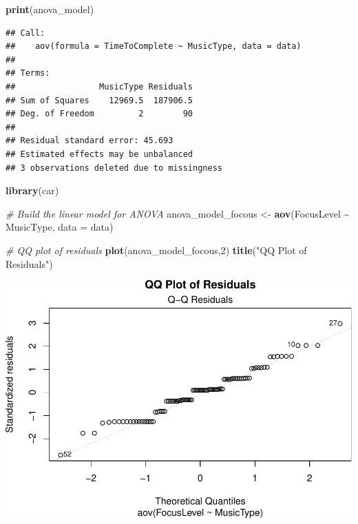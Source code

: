 \documentclass[
]{article}
\newenvironment{Shaded}{\begin{snugshade}}{\end{snugshade}}
\newcommand{\AttributeTok}[1]{\textcolor[rgb]{0.13,0.29,0.53}{#1}}
\newcommand{\CommentTok}[1]{\textcolor[rgb]{0.56,0.35,0.01}{\textit{#1}}}
\newcommand{\DecValTok}[1]{\textcolor[rgb]{0.00,0.00,0.81}{#1}}
\newcommand{\FunctionTok}[1]{\textcolor[rgb]{0.13,0.29,0.53}{\textbf{#1}}}
\newcommand{\NormalTok}[1]{#1}
\newcommand{\OtherTok}[1]{\textcolor[rgb]{0.56,0.35,0.01}{#1}}
\newcommand{\SpecialCharTok}[1]{\textcolor[rgb]{0.81,0.36,0.00}{\textbf{#1}}}
\newcommand{\StringTok}[1]{\textcolor[rgb]{0.31,0.60,0.02}{#1}}
\begin{document}
\begin{Shaded}
\begin{Highlighting}[]
\FunctionTok{print}\NormalTok{(anova\_model)}
\end{Highlighting}
\end{Shaded}

\begin{verbatim}
## Call:
##    aov(formula = TimeToComplete ~ MusicType, data = data)
## 
## Terms:
##                 MusicType Residuals
## Sum of Squares    12969.5  187906.5
## Deg. of Freedom         2        90
## 
## Residual standard error: 45.693
## Estimated effects may be unbalanced
## 3 observations deleted due to missingness
\end{verbatim}

\begin{Shaded}
\begin{Highlighting}[]
\FunctionTok{library}\NormalTok{(car)    }

\CommentTok{\# Build the linear model for ANOVA}
\NormalTok{anova\_model\_focous }\OtherTok{\textless{}{-}} \FunctionTok{aov}\NormalTok{(FocusLevel }\SpecialCharTok{\textasciitilde{}}\NormalTok{ MusicType, }\AttributeTok{data =}\NormalTok{ data)}

\CommentTok{\# QQ plot of residuals}
\FunctionTok{plot}\NormalTok{(anova\_model\_focous,}\DecValTok{2}\NormalTok{) }
\FunctionTok{title}\NormalTok{(}\StringTok{"QQ Plot of Residuals"}\NormalTok{)}
\end{Highlighting}
\end{Shaded}

\includegraphics{Assignment2_files/figure-latex/unnamed-chunk-8-1.pdf}
\end{document}
